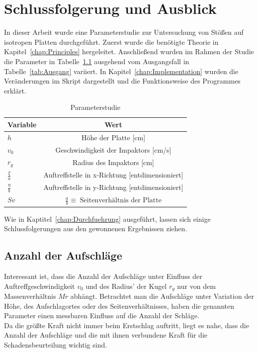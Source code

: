 \chapter{Schlussfolgerung und Ausblick}
\label{Conclusion}

In dieser Arbeit wurde eine Parameterstudie zur Untersuchung von Stößen auf isotropen Platten durchgeführt. Zuerst wurde die benötigte Theorie in Kapitel~\ref{chap:Principles} hergeleitet. Anschließend wurden im Rahmen der Studie die Parameter in Tabelle~\ref{tab:VariierteParams} ausgehend vom Ausgangsfall in Tabelle~\ref{tab:Ausgang} variiert. In Kapitel~\ref{chap:Implementation} wurden die Veränderungen im Skript dargestellt und die Funktionsweise des Programmes erklärt. 

\begin{table}[H]
	\begin{center}
		\caption{Parameterstudie}
		\label{tab:VariierteParams}
		\begin{tabular}{l|c}
			\textbf{Variable} & \textbf{Wert}\\
			\hline
			$h$ & Höhe der Platte [cm]\\
			$v_{0}$ & Geschwindigkeit der Impaktors [cm/s]\\
			$r_{g}$ & Radius des Impaktors [cm]\\
			$\frac{\xi}{a}$ & Auftreffstelle in x-Richtung [entdimensioniert]\\
			$\frac{\eta}{b}$ & Auftreffstelle in y-Richtung [entdimensioniert]\\
			$Sv$ & $\frac{a}{b} \equiv \; \mbox{Seitenverhältnis der Platte}$ \\		
		\end{tabular}
	\end{center}
\end{table}

Wie in Kaptitel~\ref{chap:Durchfuehrung} ausgeführt, lassen sich einige Schlussfolgerungen aus den gewonnenen Ergebnissen ziehen. \\

\section{Anzahl der Aufschläge}
\label{sec:Aufschlag}

Interessant ist, dass die Anzahl der Aufschläge unter Einfluss der Auftreffgeschwindigkeit $v_{0}$ und des Radius' der Kugel $r_{g}$ nur von dem Massenverhältnis $Mr$ abhängt. Betrachtet man die Aufschläge unter Variation der Höhe, des Aufschlagortes oder des Seitenverhältnisses, haben die genannten Parameter einen messbaren Einfluss auf die Anzahl der Schläge. \\
Da die größte Kraft nicht immer beim Erstschlag auftritt, liegt es nahe, dass die Anzahl der Aufschläge und die mit ihnen verbundene Kraft für die Schadensbeurteilung wichtig sind.\\

